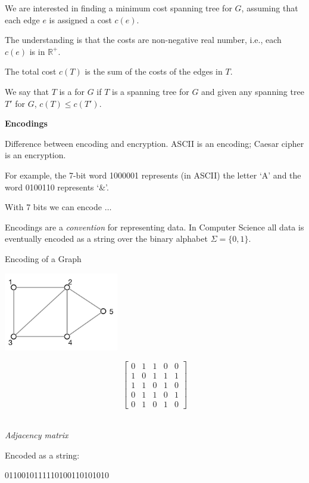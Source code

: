 \begin{frame}
We are interested in finding a minimum cost spanning tree for $G$,
assuming that each edge $e$ is assigned a cost $c(e)$.  

The
understanding is that the costs are non-negative real number, i.e.,
each $c(e)$ is in $\mathbb{R}^+$.  

The total cost $c(T)$ is the sum of
the costs of the edges in $T$.  

We say that $T$ is a 
for $G$ if $T$ is a spanning tree for $G$ and
given any spanning tree $T'$ for $G$, $c(T)\leq c(T')$.
\end{frame}

\begin{frame}
{\bf Encodings}

Difference between encoding and encryption. ASCII is an encoding;
Caesar cipher is an encryption.

For example, the 7-bit word 1000001 represents (in ASCII) the letter
`A' and the word 0100110 represents `\&'.  

With 7 bits we can encode $\ldots$

Encodings are a {\em convention} for representing data. In Computer
Science all data is eventually encoded as a string over the binary
alphabet $\Sigma=\{0,1\}$.
\end{frame}

\begin{frame}
{Encoding of a Graph}

\begin{minipage}{5cm}
\includegraphics[width=5cm]{Figures/basic-graph.jpg}
\end{minipage}
\begin{minipage}{5cm}
$$
\left[
\begin{array}{ccccc}
0&1&1&0&0\\
1&0&1&1&1\\
1&1&0&1&0\\
0&1&1&0&1\\
0&1&0&1&0
\end{array}
\right]
$$ \\[-10mm]
\begin{center}
{\em Adjacency matrix}
\end{center}
\end{minipage}

Encoded as a string:

0110010111110100110101010
\end{frame}

